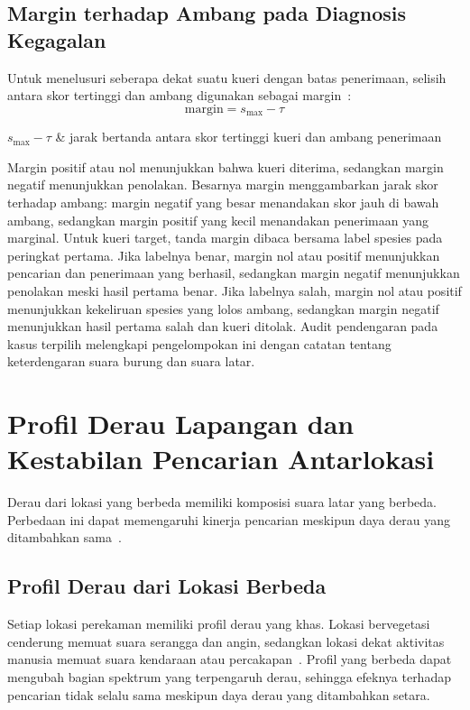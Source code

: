 \subsection{Margin terhadap Ambang pada Diagnosis Kegagalan}

Untuk menelusuri seberapa dekat suatu kueri dengan batas penerimaan, selisih antara skor tertinggi dan ambang digunakan sebagai margin~\cite{hassanzad2024youden}:
\begin{equation}\label{eq:margin}
\mathrm{margin} = s_{\max} - \tau
\end{equation}
\begin{keteranganRumus}
$s_{\max}-\tau$ & jarak bertanda antara skor tertinggi kueri dan ambang penerimaan
\end{keteranganRumus}

Margin positif atau nol menunjukkan bahwa kueri diterima, sedangkan margin negatif menunjukkan penolakan. Besarnya margin menggambarkan jarak skor terhadap ambang: margin negatif yang besar menandakan skor jauh di bawah ambang, sedangkan margin positif yang kecil menandakan penerimaan yang marginal. Untuk kueri target, tanda margin dibaca bersama label spesies pada peringkat pertama. Jika labelnya benar, margin nol atau positif menunjukkan pencarian dan penerimaan yang berhasil, sedangkan margin negatif menunjukkan penolakan meski hasil pertama benar. Jika labelnya salah, margin nol atau positif menunjukkan kekeliruan spesies yang lolos ambang, sedangkan margin negatif menunjukkan hasil pertama salah dan kueri ditolak. Audit pendengaran pada kasus terpilih melengkapi pengelompokan ini dengan catatan tentang keterdengaran suara burung dan suara latar.

\section{Profil Derau Lapangan dan Kestabilan Pencarian Antarlokasi}

Derau dari lokasi yang berbeda memiliki komposisi suara latar yang berbeda. Perbedaan ini dapat memengaruhi kinerja pencarian meskipun daya derau yang ditambahkan sama~\cite{clark2023soundscape}.

\subsection{Profil Derau dari Lokasi Berbeda}

Setiap lokasi perekaman memiliki profil derau yang khas. Lokasi bervegetasi cenderung memuat suara serangga dan angin, sedangkan lokasi dekat aktivitas manusia memuat suara kendaraan atau percakapan~\cite{clark2023soundscape}. Profil yang berbeda dapat mengubah bagian spektrum yang terpengaruh derau, sehingga efeknya terhadap pencarian tidak selalu sama meskipun daya derau yang ditambahkan setara.

